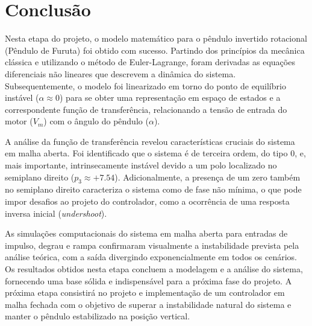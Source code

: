 \documentclass[9pt,a4paper,twocolumn,twoside]{tau-class/tau}
\begin{document}
\section{Conclusão}
Nesta etapa do projeto, o modelo matemático para o pêndulo invertido rotacional (Pêndulo de Furuta) foi obtido com sucesso. Partindo dos princípios da mecânica clássica e utilizando o método de Euler-Lagrange, foram derivadas as equações diferenciais não lineares que descrevem a dinâmica do sistema. Subsequentemente, o modelo foi linearizado em torno do ponto de equilíbrio instável (\(\alpha \approx 0\)) para se obter uma representação em espaço de estados e a correspondente função de transferência, relacionando a tensão de entrada do motor (\(V_m\)) com o ângulo do pêndulo (\(\alpha\)).

A análise da função de transferência revelou características cruciais do sistema em malha aberta. Foi identificado que o sistema é de terceira ordem, do tipo 0, e, mais importante, intrinsecamente instável devido a um polo localizado no semiplano direito (\(p_3 \approx +7.54\)). Adicionalmente, a presença de um zero também no semiplano direito caracteriza o sistema como de fase não mínima, o que pode impor desafios ao projeto do controlador, como a ocorrência de uma resposta inversa inicial (\textit{undershoot}).

As simulações computacionais do sistema em malha aberta para entradas de impulso, degrau e rampa confirmaram visualmente a instabilidade prevista pela análise teórica, com a saída divergindo exponencialmente em todos os cenários. Os resultados obtidos nesta etapa concluem a modelagem e a análise do sistema, fornecendo uma base sólida e indispensável para a próxima fase do projeto. A próxima etapa consistirá no projeto e implementação de um controlador em malha fechada com o objetivo de superar a instabilidade natural do sistema e manter o pêndulo estabilizado na posição vertical.

    
    
\end{document}
